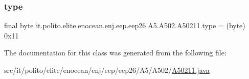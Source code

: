 \subsubsection{\texorpdfstring{type}{type}}
{\footnotesize\ttfamily final byte it.\+polito.\+elite.\+enocean.\+enj.\+eep.\+eep26.\+A5.\+A502.\+A50211.\+type = (byte) 0x11\hspace{0.3cm}{\ttfamily [static]}}



The documentation for this class was generated from the following file\+:\begin{DoxyCompactItemize}
\item 
src/it/polito/elite/enocean/enj/eep/eep26/\+A5/\+A502/\hyperlink{_a50211_8java}{A50211.\+java}\end{DoxyCompactItemize}
